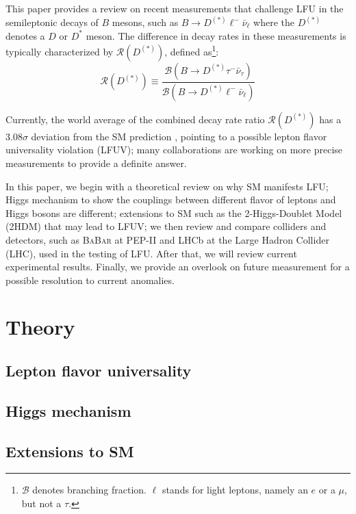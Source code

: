\documentclass[12pt,letterpaper]{article}
\def\BaBar/{\textsc{BaBar}}
\def\RDDst/{\ensuremath{\mathcal{R}(D^{(*)})}}
\def\DDst/{\ensuremath{D^{(*)}}}
\def\Dst/{\ensuremath{D^*}}
\newcommand{\BMesonMode}[2]{\ensuremath{
    B \rightarrow #2 #1^- \bar{\nu}_#1
}}
\newcommand{\BDDstMode}[1]{\BMesonMode{#1}{\DDst/}}
\begin{document}
This paper provides a review on recent measurements that challenge LFU
in the semileptonic decays of $B$ mesons, such as
\BDDstMode{\ell} where the \DDst/ denotes a $D$ or \Dst/ meson.
The difference in decay rates in these measurements is typically characterized
by \RDDst/, defined as\footnote{
    $\mathcal{B}$ denotes branching fraction.
    $\ell$ stands for light leptons, namely an $e$ or a $\mu$, but not a $\tau$.
}:
\begin{equation}
    \RDDst/ \equiv \frac{
        \mathcal{B}\left( \BDDstMode{\tau} \right)
    }{
        \mathcal{B}\left( \BDDstMode{\ell} \right)
    }
\end{equation}

Currently, the world average of the combined decay rate ratio \RDDst/
has a $3.08\sigma$ deviation from the SM prediction \cite{HFLAV:2019}, pointing
to a possible lepton flavor universality violation (LFUV);
many collaborations are working on more precise measurements to provide a
definite answer.

In this paper, we begin with a theoretical review on why SM manifests LFU;
Higgs mechanism to show the couplings between different flavor of leptons and
Higgs bosons are different;
extensions to SM such as the 2-Higgs-Doublet Model (2HDM) that may lead to LFUV;
we then review and compare colliders and detectors, such as \BaBar/ at PEP-II
and LHCb at the Large Hadron Collider (LHC), used in the testing of LFU.
After that, we will review current experimental results.
Finally, we provide an overlook on future measurement for a possible resolution
to current anomalies.

\section{Theory}
\subsection{Lepton flavor universality} \label{sec:lfu}


\subsection{Higgs mechanism}


\subsection{Extensions to SM}

\end{document}
